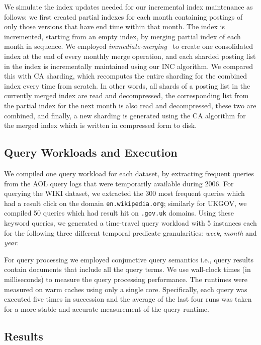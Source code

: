 We simulate the index updates needed for our incremental index
maintenance as follows: we first created partial indexes for each
month containing postings of only those versions that have end time
within that month. The index is incremented, starting from an empty
index, by merging partial index of each month in sequence. We employed
\emph{immediate-merging}~\cite{BuettcherCC10} to create one
consolidated index at the end of every monthly merge operation, and
each sharded posting list in the index is incrementally maintained
using our INC algorithm. We compared this with CA sharding, which
recomputes the entire sharding for the combined index every time from
scratch. In other words, all shards of a posting list in the currently
merged index are read and decompressed, the corresponding list from
the partial index for the next month is also read and decompressed,
these two are combined, and finally, a new sharding is generated using
the CA algorithm for the merged index which is written in compressed
form to disk.

\subsection{Query Workloads and Execution}
\label{sec:workload}
We compiled one query workload for each dataset, by extracting
frequent queries from the AOL query logs that were temporarily
available during 2006. For querying the WIKI dataset, we extracted the 300
most frequent queries which had a result click on the domain
\texttt{en.wikipedia.org}; similarly for UKGOV, we compiled 50 queries
which had result hit on \texttt{.gov.uk} domains. Using these keyword
queries, we generated a time-travel query workload with 5 instances
each for the following three different temporal predicate
granularities: \emph{week}, \emph{month} and \emph{year}.

For query processing we employed conjunctive query semantics i.e.,
query results contain documents that include all the query terms. We
use wall-clock times (in milliseconds) to measure the query processing
performance. The runtimes were measured on warm caches using only a
single core. Specifically, each query was executed five times in
succession and the average of the last four runs was taken for a more
stable and accurate measurement of the query runtime.


\subsection{Results}
